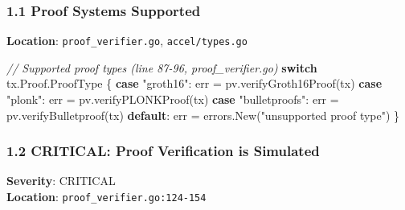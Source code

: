 \documentclass[
]{article}
\newenvironment{Shaded}{}{}
\newcommand{\CommentTok}[1]{\textcolor[rgb]{0.38,0.63,0.69}{\textit{#1}}}
\newcommand{\ControlFlowTok}[1]{\textcolor[rgb]{0.00,0.44,0.13}{\textbf{#1}}}
\newcommand{\NormalTok}[1]{#1}
\newcommand{\OperatorTok}[1]{\textcolor[rgb]{0.40,0.40,0.40}{#1}}
\newcommand{\StringTok}[1]{\textcolor[rgb]{0.25,0.44,0.63}{#1}}
\begin{document}
\subsubsection{1.1 Proof Systems
Supported}\label{11-proof-systems-supported}

\textbf{Location}: \texttt{proof\_verifier.go}, \texttt{accel/types.go}

\begin{Shaded}
\begin{Highlighting}[]
\CommentTok{// Supported proof types (line 87{-}96, proof\_verifier.go)}
\ControlFlowTok{switch}\NormalTok{ tx}\OperatorTok{.}\NormalTok{Proof}\OperatorTok{.}\NormalTok{ProofType }\OperatorTok{\{}
\ControlFlowTok{case} \StringTok{"groth16"}\OperatorTok{:}
\NormalTok{    err }\OperatorTok{=}\NormalTok{ pv}\OperatorTok{.}\NormalTok{verifyGroth16Proof}\OperatorTok{(}\NormalTok{tx}\OperatorTok{)}
\ControlFlowTok{case} \StringTok{"plonk"}\OperatorTok{:}
\NormalTok{    err }\OperatorTok{=}\NormalTok{ pv}\OperatorTok{.}\NormalTok{verifyPLONKProof}\OperatorTok{(}\NormalTok{tx}\OperatorTok{)}
\ControlFlowTok{case} \StringTok{"bulletproofs"}\OperatorTok{:}
\NormalTok{    err }\OperatorTok{=}\NormalTok{ pv}\OperatorTok{.}\NormalTok{verifyBulletproof}\OperatorTok{(}\NormalTok{tx}\OperatorTok{)}
\ControlFlowTok{default}\OperatorTok{:}
\NormalTok{    err }\OperatorTok{=}\NormalTok{ errors}\OperatorTok{.}\NormalTok{New}\OperatorTok{(}\StringTok{"unsupported proof type"}\OperatorTok{)}
\OperatorTok{\}}
\end{Highlighting}
\end{Shaded}

\subsubsection{1.2 CRITICAL: Proof Verification is
Simulated}\label{12-critical-proof-verification-is-simulated}

\textbf{Severity}: CRITICAL\\
\textbf{Location}: \texttt{proof\_verifier.go:124-154}
\end{document}
